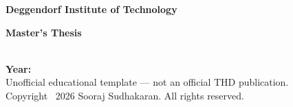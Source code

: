 \begin{titlepage}
  \thispagestyle{empty}
  \begin{center}
    \vspace*{0.5cm}
    {\bfseries\large Deggendorf Institute of Technology\par}
    \vspace{1.0cm}
    {\bfseries\huge Master's Thesis\par}
    \vspace*{\fill}
    {\bfseries\large \ThesisTitle\par}
    \vspace*{\fill}
    {\bfseries\large \StudentName}\\[0.4cm]
    {\bfseries\large Year: \SubmissionYear}\\[0.8cm]
    {\footnotesize Unofficial educational template --- not an official THD publication.}\\[0.25cm]
    {\footnotesize Copyright \textcopyright\ 2026 Sooraj Sudhakaran. All rights reserved.}
  \end{center}
\end{titlepage}

